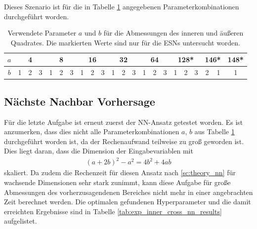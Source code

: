 Dieses Szenario ist für die in Tabelle \ref{tab:exp_inner_cross_pred_parameter} angegebenen Parameterkombinationen durchgeführt worden.

\begin{table}[h]
	\centering
	\begin{tabular}{c|c|c|c|c|c|c|c|c|c|c|c|c|c|c|c|c|c|c|c|c|c|}
		$a$ & \multicolumn{3}{c|}{4} & \multicolumn{3}{c|}{8} & \multicolumn{3}{c|}{16} & \multicolumn{3}{c|}{32} & \multicolumn{3}{c|}{64} & \multicolumn{3}{c|}{128*} & \multicolumn{2}{c|}{146*} & 148* \\
		\hline
		$b$ & 1 & 2 & 3 & 1 & 2 & 3 & 1 & 2 & 3 & 1 & 2 & 3 & 1 & 2 & 3 & 1 & 2 & 3 & 2 & 1 & 1 \\
	\end{tabular} 
	\caption{Verwendete Parameter $a$ und $b$ für die Abmessungen des inneren und äußeren Quadrates. Die markierten Werte sind nur für die \textsc{ESN}s untersucht worden.}
	\label{tab:exp_inner_cross_pred_parameter}
\end{table} 

\subsection{Nächste Nachbar Vorhersage}
Für die letzte Aufgabe ist erneut zuerst der \textsc{NN}-Ansatz getestet worden. Es ist anzumerken, dass dies nicht alle Parameterkombinationen $a$, $b$ aus Tabelle \ref{tab:exp_inner_cross_pred_parameter} durchgeführt worden ist, da der Rechenaufwand teilweise zu groß geworden ist. Dies liegt daran, dass die Dimension der Eingabevariablen mit
\begin{align*}
(a+2b)^2-a^2 = 4b^2+4ab
\end{align*}
skaliert. Da zudem die Rechenzeit für diesen Ansatz nach \ref{sc:theory_nn} für wachsende Dimensionen sehr stark zunimmt, kann diese Aufgabe für große Abmessungen des vorherzusagendenen Bereiches nicht mehr in einer angebrachten Zeit berechnet werden.
Die optimalen gefundenen Hyperparameter und die damit erreichten Ergebnisse sind in Tabelle \ref{tab:exp_inner_cross_nn_results} aufgelistet.

